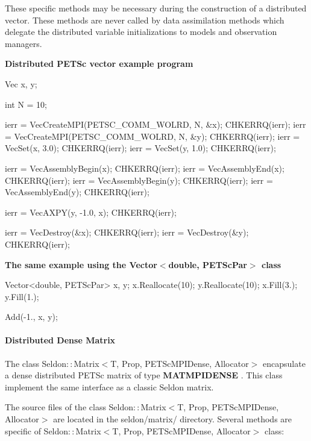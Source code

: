 \documentclass{tufte-book}
\begin{document}
\par These specific methods may be necessary during the construction of a distributed vector. These methods are never called by data assimilation methods which delegate the distributed variable initializations to models and observation managers.


\textbf{Distributed PETSc vector example program}


\begin{frame_cpp}

    Vec x, y;

    int N = 10;

    ierr = VecCreateMPI(PETSC_COMM_WOLRD, N, &x); CHKERRQ(ierr);
    ierr = VecCreateMPI(PETSC_COMM_WOLRD, N, &y); CHKERRQ(ierr);
    ierr = VecSet(x, 3.0); CHKERRQ(ierr);
    ierr = VecSet(y, 1.0); CHKERRQ(ierr);

    ierr = VecAssemblyBegin(x); CHKERRQ(ierr);
    ierr = VecAssemblyEnd(x); CHKERRQ(ierr);
    ierr = VecAssemblyBegin(y); CHKERRQ(ierr);
    ierr = VecAssemblyEnd(y); CHKERRQ(ierr);

    ierr = VecAXPY(y, -1.0, x); CHKERRQ(ierr);

    ierr = VecDestroy(&x); CHKERRQ(ierr);
    ierr = VecDestroy(&y); CHKERRQ(ierr);


\end{frame_cpp}


\textbf{The same example using the Vector$<$double, PETScPar$>$ class}

\begin{frame_cpp}

    Vector<double, PETScPar> x, y;
    x.Reallocate(10);
    y.Reallocate(10);
    x.Fill(3.);
    y.Fill(1.);

    Add(-1., x, y);

\end{frame_cpp}


\hypertarget{seq-par-ds-dmatrix}{}\paragraph{Distributed Dense Matrix}\label{seq-par-ds-dmatrix}


The class Seldon$::$Matrix$<$T, Prop, PETScMPIDense, Allocator$>$  encapsulate a  dense distributed PETSc matrix of type \textbf{MATMPIDENSE} . This class implement the same interface as a classic Seldon matrix.

The source files of the class Seldon$::$Matrix$<$T, Prop, PETScMPIDense, Allocator$>$   are located in the seldon/matrix/ directory. Several methods are specific of  Seldon$::$Matrix$<$T, Prop, PETScMPIDense, Allocator$>$  class:
\end{document}
